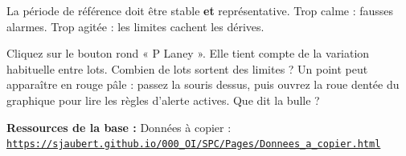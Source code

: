 \documentclass[10pt,a4paper]{article}
\begin{document}
\begin{tcolorbox}[retenir]La période de référence doit être stable \textbf{et} représentative. Trop calme : fausses alarmes. Trop agitée : les limites cachent les dérives.\end{tcolorbox}
\begin{tcolorbox}[plus]Cliquez sur le bouton rond « P Laney ». Elle tient compte de la variation habituelle entre lots. Combien de lots sortent des limites ? Un point peut apparaître en rouge pâle : passez la souris dessus, puis ouvrez la roue dentée du graphique pour lire les règles d'alerte actives. Que dit la bulle ?\end{tcolorbox}
\vfill{\footnotesize\color{uimm}\textbf{Ressources de la base :} Données à copier : \href{https://sjaubert.github.io/000_OI/SPC/Pages/Donnees_a_copier.html\#inspection}{\nolinkurl{https://sjaubert.github.io/000_OI/SPC/Pages/Donnees_a_copier.html}}}
\end{document}
